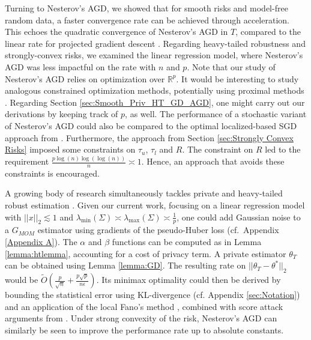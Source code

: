 \documentclass{article}
\begin{document}
Turning to Nesterov's AGD, we showed that for smooth risks and model-free random data, a faster convergence rate can be achieved through acceleration. This echoes the quadratic convergence of Nesterov's AGD in $T$, compared to the linear rate for projected gradient descent \cite{Nester}. Regarding heavy-tailed robustness and strongly-convex risks, we examined the linear regression model, where Nesterov's AGD was less impactful on the rate with $n$ and $p$.
Note that our study of Nesterov's AGD relies on optimization over $\mathbb{R}^p$. It would be interesting to study analogous constrained optimization methods, potentially using proximal methods \cite{Beck_Proximal_2009}. Regarding Section \ref{sec:Smooth_Priv_HT_GD_AGD}, one might carry out our derivations by keeping track of $p$, as well. The performance of a stochastic variant of Nesterov's AGD could also be compared to the optimal localized-based SGD approach from \cite{SCO_Feldman_2020}.
Furthermore, the approach from Section \ref{sec:Strongly Convex Risks} imposed some constraints on $\tau_u$, $\tau_l$ and $R$. The constraint on $R$ led to the requirement $\frac{p\log(n)\log(\log(n))}{n} \asymp 1$. Hence, an approach that avoids these constraints is encouraged.

A growing body of research simultaneously tackles private and heavy-tailed robust estimation  \cite{DP_ROB_HIGH_DIM, NO_ROB_LR, Kamath_Priv_HT, ROB_LR_OPT_POLY}. Given our current work, focusing on a linear regression model with $||x||_2 \lesssim 1$ and $\lambda_{\min}(\Sigma) \asymp \lambda_{\max}(\Sigma) \asymp \frac{1}{p}$, one could add Gaussian noise to a $G_{MOM}$ estimator using gradients of the pseudo-Huber loss (cf.\ Appendix \ref{Appendix A}). The $\alpha$ and $\beta$ functions can be computed as in Lemma \ref{lemma:htlemma}, accounting for a cost of privacy term. A private estimator $\theta_T$ can be obtained using Lemma \ref{lemma:GD}.
The resulting rate on $||\theta_T - \theta^*||_2$ would be $\widetilde{O}\left(\frac{p}{\sqrt{n}} + \frac{p\sqrt{p}}{n\epsilon}\right)$. Its minimax optimality could then be derived by bounding the statistical error using KL-divergence (cf. Appendix \ref{sec:Notation}) and an application of the local Fano's method \cite{Prob_Stats_Chen, Stats_Info_Duchi}, combined with score attack arguments from \cite{Cost_Priv_Lin_Reg}. Under strong convexity of the risk, Nesterov's AGD can similarly be seen to improve the performance rate up to absolute constants.
\end{document}
